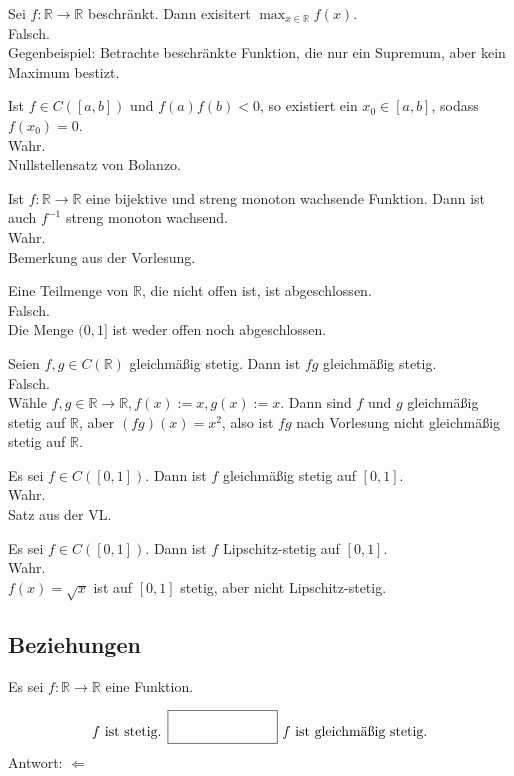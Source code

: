 \documentclass[parskip=full]{scrartcl}
\begin{document}
Sei $f : \mathbb{R} \to \mathbb{R}$ beschränkt.
Dann exisitert $\max_{x \in \mathbb{R}} f(x)$.\\
Falsch.\\
Gegenbeispiel: Betrachte beschränkte Funktion, die nur ein Supremum, aber kein Maximum bestizt.

Ist $f \in C([a,b])$ und $f(a)f(b) < 0$, so existiert ein $x_0 \in [a,b]$, sodass $f(x_0) = 0$.\\
Wahr.\\
Nullstellensatz von Bolanzo.

Ist $f : \mathbb{R} \to \mathbb{R}$ eine bijektive und streng monoton wachsende Funktion.
Dann ist auch $f^{-1}$ streng monoton wachsend.\\
Wahr.\\
Bemerkung aus der Vorlesung.

Eine Teilmenge von $\mathbb{R}$, die nicht offen ist, ist abgeschlossen.\\
Falsch.\\
Die Menge $(0,1]$ ist weder offen noch abgeschlossen.

Seien $f,g \in C(\mathbb{R})$ gleichmäßig stetig.
Dann ist $fg$ gleichmäßig stetig.\\
Falsch.\\
Wähle  $f,g \in \mathbb{R} \to \mathbb{R}, f(x) := x, g(x) := x$.
Dann sind $f$ und $g$ gleichmäßig stetig auf $\mathbb{R}$, aber $(fg)(x) = x^2$, also ist $fg$ nach Vorlesung nicht gleichmäßig stetig auf $\mathbb{R}$.

Es sei $f \in C([0,1])$. Dann ist $f$ gleichmäßig stetig auf $[0,1]$.\\
Wahr.\\
Satz aus der VL.

Es sei $f \in C([0,1])$. Dann ist $f$ Lipschitz-stetig auf $[0,1]$.\\
Wahr.\\
$f(x) = \sqrt{x}$ ist auf $[0,1]$ stetig, aber nicht Lipschitz-stetig.

\subsection{Beziehungen}
Es sei $f : \mathbb{R} \to \mathbb{R}$ eine Funktion.

\begin{displaymath}
  f \text{ ist stetig. } \fbox{\rule{1in}{0pt}\rule[-0.5ex]{0pt}{4ex}} \text{ } f \text{ ist gleichmäßig stetig.}
\end{displaymath}
Antwort: $\Leftarrow$
\end{document}
